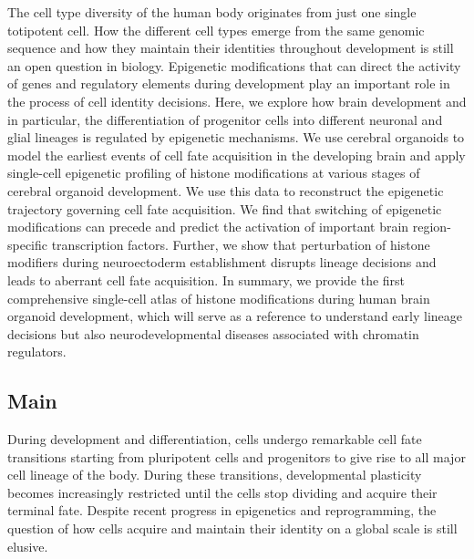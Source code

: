The cell type diversity of the human body originates from just one single totipotent cell. How the different cell types emerge from the same genomic sequence and how they maintain their identities throughout development is still an open question in biology. Epigenetic modifications that can direct the activity of genes and regulatory elements during development play an important role in the process of cell identity decisions.
Here, we explore how brain development and in particular, the differentiation of progenitor cells into different neuronal and glial lineages is regulated by epigenetic mechanisms. We use cerebral organoids to model the earliest events of cell fate acquisition in the developing brain and apply single-cell epigenetic profiling of histone modifications at various stages of cerebral organoid development. We use this data to reconstruct the epigenetic trajectory governing cell fate acquisition. We find that switching of epigenetic modifications can precede and predict the activation of important brain region-specific transcription factors. Further, we show that perturbation of histone modifiers during neuroectoderm establishment disrupts lineage decisions and leads to aberrant cell fate acquisition. In summary, we provide the first comprehensive single-cell atlas of histone modifications during human brain organoid development, which will serve as a reference to understand early lineage decisions but also neurodevelopmental diseases associated with chromatin regulators.


\subsection{Main}

During development and differentiation, cells undergo remarkable cell fate transitions starting from pluripotent cells and progenitors to give rise to all major cell lineage of the body. During these transitions, developmental plasticity becomes increasingly restricted until the cells stop dividing and acquire their terminal fate. Despite recent progress in epigenetics and reprogramming, the question of how cells acquire and maintain their identity on a global scale is still elusive. 

